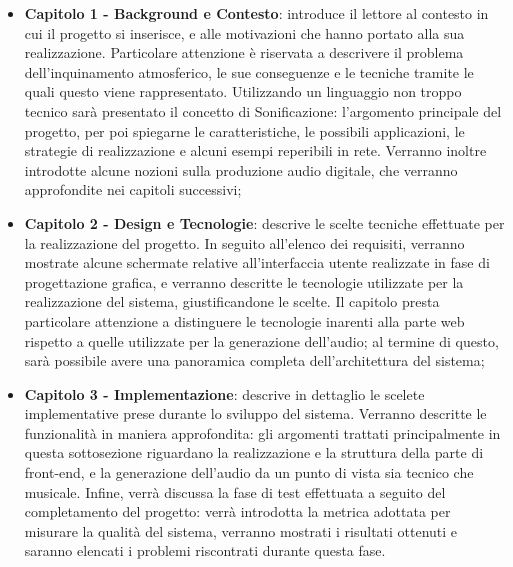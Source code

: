 \begin{itemize}
    \item \textbf{Capitolo 1 - Background e Contesto}: introduce il lettore al contesto in cui il progetto si inserisce, e alle motivazioni che hanno portato alla sua realizzazione.
    Particolare attenzione è riservata a descrivere il problema dell'inquinamento atmosferico, le sue conseguenze e le tecniche tramite le quali questo viene rappresentato.
    Utilizzando un linguaggio non troppo tecnico sarà presentato il concetto di Sonificazione: l'argomento principale del progetto, per poi spiegarne le caratteristiche, le possibili applicazioni, le strategie di realizzazione e alcuni esempi reperibili in rete.
    Verranno inoltre introdotte alcune nozioni sulla produzione audio digitale, che verranno approfondite nei capitoli successivi;
    \item \textbf{Capitolo 2 - Design e Tecnologie}: descrive le scelte tecniche effettuate per la realizzazione del progetto.
    In seguito all'elenco dei requisiti, verranno mostrate alcune schermate relative all'interfaccia utente realizzate in fase di progettazione grafica, e verranno descritte le tecnologie utilizzate per la realizzazione del sistema, giustificandone le scelte.
    Il capitolo presta particolare attenzione a distinguere le tecnologie inarenti alla parte web rispetto a quelle utilizzate per la generazione dell'audio;
    al termine di questo, sarà possibile avere una panoramica completa dell'architettura del sistema;
    \newpage
    \item \textbf{Capitolo 3 - Implementazione}: descrive in dettaglio le scelete implementative prese durante lo sviluppo del sistema.
    Verranno descritte le funzionalità in maniera approfondita: gli argomenti trattati principalmente in questa sottosezione riguardano la realizzazione e la struttura della parte di front-end, e la generazione dell'audio da un punto di vista sia tecnico che musicale.
    Infine, verrà discussa la fase di test effettuata a seguito del completamento del progetto: verrà introdotta la metrica adottata per misurare la qualità del sistema, verranno mostrati i risultati ottenuti e saranno elencati i problemi riscontrati durante questa fase.
\end{itemize}

\clearpage{\pagestyle{empty}\cleardoublepage}

